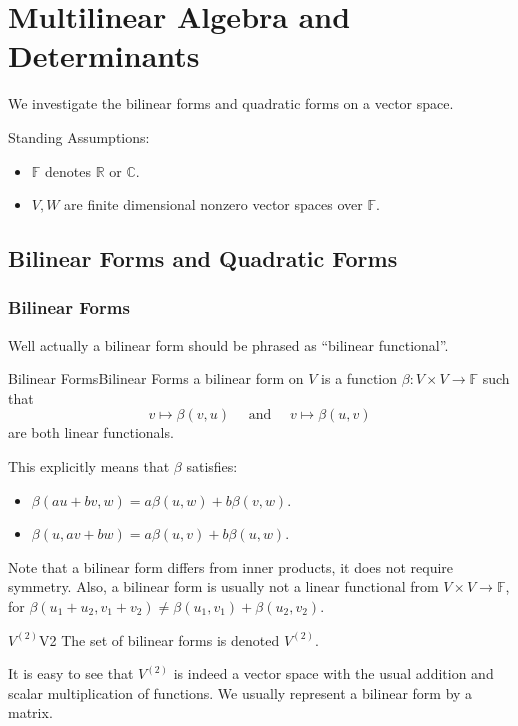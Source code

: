 \documentclass[../main.tex]{subfiles}
\begin{document}
\chapter{Multilinear Algebra and Determinants}

We investigate the bilinear forms and quadratic forms on a vector space.

\begin{plainblackenv}
Standing Assumptions:
\begin{itemize}
\item $\mathbb{F}$ denotes $\mathbb{R}$ or $\mathbb{C}$.
\item $V,W$ are finite dimensional nonzero vector spaces over $\mathbb{F}$.
\end{itemize}
\end{plainblackenv}

\section{Bilinear Forms and Quadratic Forms}
\subsection{Bilinear Forms}
Well actually a bilinear form should be phrased as ``bilinear functional''.

\begin{definition}{Bilinear Forms}{Bilinear Forms}
a bilinear form on $V$ is a function $\beta: V \times V \rightarrow \mathbb{F}$ such that
\begin{equation*}
v \mapsto \beta(v,u) \quad \text{ and }\quad v \mapsto \beta(u,v)
\end{equation*}
are both linear functionals.
\end{definition}

This explicitly means that $\beta$ satisfies:
\begin{itemize}
\item $\beta(au+bv,w) = a \beta(u,w) + b \beta(v,w)$.
\item $\beta(u,av+bw) = a \beta(u,v) + b \beta(u,w)$.
\end{itemize}
Note that a bilinear form differs from inner products, it does not require symmetry. Also, a bilinear form is usually not a linear functional from $V \times V \rightarrow \mathbb{F}$, for $\beta(u_1+u_2,v_1+v_2)\neq \beta(u_1,v_1)+\beta(u_2,v_2)$.

\begin{definition}{$V^{(2)}$}{V2}
The set of bilinear forms is denoted $V^{(2)}$.
\end{definition}
It is easy to see that $V^{(2)}$ is indeed a vector space with the usual addition and scalar multiplication of functions. We usually represent a bilinear form by a matrix.
\end{document}
